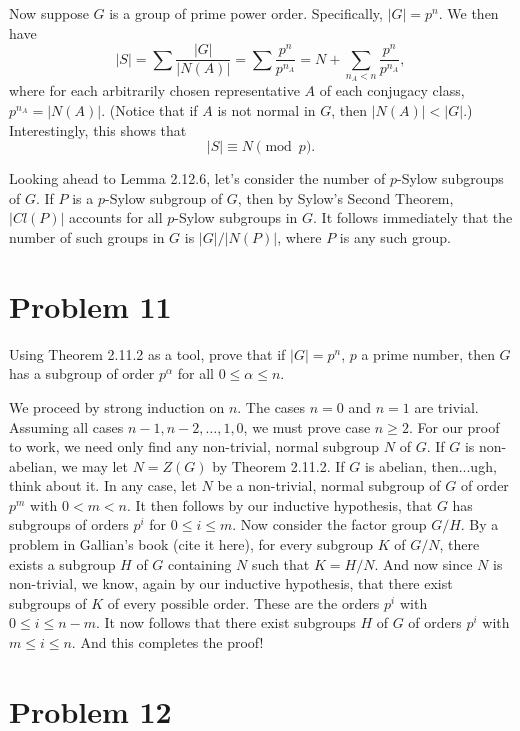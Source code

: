 \documentclass[12pt]{article}
\begin{document}
Now suppose $G$ is a group of prime power order.  Specifically, $|G|=p^n$.
We then have
\begin{equation*}
|S| = \sum\frac{|G|}{|N(A)|}=\sum\frac{p^n}{p^{n_A}}=  N+\sum_{n_A<n}\frac{p^n}{p^{n_A}},
\end{equation*}
where for each arbitrarily chosen representative $A$ of each conjugacy class, $p^{n_A}=|N(A)|$.
(Notice that if $A$ is not normal in $G$, then $|N(A)|<|G|$.)  Interestingly, this shows that
\begin{equation*}
|S|\equiv N\pmod{p}.
\end{equation*}

Looking ahead to Lemma 2.12.6, let's consider the number of $p$-Sylow subgroups of $G$.
If $P$ is a $p$-Sylow subgroup of $G$, then by Sylow's Second Theorem, $|Cl(P)|$ accounts
for all $p$-Sylow subgroups in $G$.  It follows immediately that the number of such
groups in $G$ is $|G|/|N(P)|$, where $P$ is any such group.

\section*{Problem 11}

Using Theorem 2.11.2 as a tool, prove that if $|G|=p^n$, $p$ a prime number,
then $G$ has a subgroup of order $p^{\alpha}$ for all $0\leq\alpha\leq n$.

We proceed by strong induction on $n$.  The cases $n=0$ and $n=1$ are trivial.  Assuming all
cases $n-1, n-2, \dots, 1, 0$, we must prove case $n\geq 2$.
For our proof to work, we need only find any non-trivial, normal subgroup $N$ of $G$.
If $G$ is non-abelian, we may let $N=Z(G)$ by Theorem 2.11.2.  If $G$ is abelian,
then...ugh, think about it.  In any case, let $N$ be a non-trivial, normal subgroup of $G$
of order $p^m$ with $0<m<n$.  It then follows by our inductive hypothesis,
that $G$ has subgroups of orders $p^i$ for $0\leq i\leq m$.
Now consider the factor group $G/H$.
By a problem in Gallian's book (cite it here), for every subgroup $K$ of $G/N$,
there exists a subgroup $H$ of $G$ containing $N$ such that $K=H/N$.
And now since $N$ is non-trivial, we know, again by our inductive hypothesis,
that there exist subgroups of $K$ of every possible order.  These
are the orders $p^i$ with $0\leq i\leq n-m$.  It now follows that there
exist subgroups $H$ of $G$ of orders $p^i$ with $m\leq i\leq n$.
And this completes the proof!

\section*{Problem 12}
\end{document}
